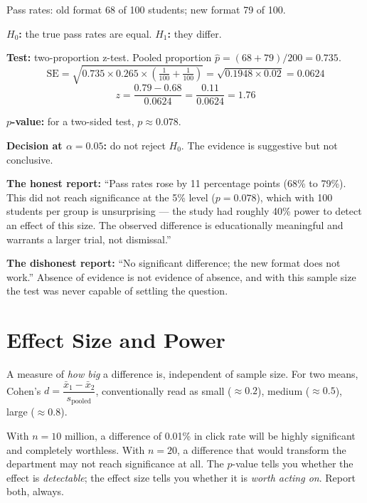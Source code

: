 \begin{worked}
Pass rates: old format 68 of 100 students; new format 79 of 100.

\smallskip
\textbf{$H_0$:} the true pass rates are equal. \quad \textbf{$H_1$:} they differ.

\textbf{Test:} two-proportion z-test.
Pooled proportion $\hat{p} = (68+79)/200 = 0.735$.
\[
\text{SE} = \sqrt{0.735 \times 0.265 \times \left(\tfrac{1}{100}+\tfrac{1}{100}\right)}
          = \sqrt{0.1948 \times 0.02} = 0.0624
\]
\[
z = \frac{0.79 - 0.68}{0.0624} = \frac{0.11}{0.0624} = 1.76
\]

\textbf{$p$-value:} for a two-sided test, $p \approx 0.078$.

\smallskip
\textbf{Decision at $\alpha = 0.05$:} do not reject $H_0$. The evidence is
suggestive but not conclusive.

\textbf{The honest report:} ``Pass rates rose by 11 percentage points
(68\% to 79\%). This did not reach significance at the 5\% level ($p = 0.078$),
which with 100 students per group is unsurprising --- the study had roughly 40\%
power to detect an effect of this size. The observed difference is educationally
meaningful and warrants a larger trial, not dismissal.''

\smallskip
\textbf{The dishonest report:} ``No significant difference; the new format does not
work.'' Absence of evidence is not evidence of absence, and with this sample size
the test was never capable of settling the question.
\end{worked}

\section{Effect Size and Power}

\begin{definitionbox}
A measure of \emph{how big} a difference is, independent of sample size. For two
means, Cohen's $d = \dfrac{\bar{x}_1 - \bar{x}_2}{s_{\text{pooled}}}$, conventionally
read as small ($\approx 0.2$), medium ($\approx 0.5$), large ($\approx 0.8$).
\end{definitionbox}

\begin{conceptbox}
With $n = 10$ million, a difference of 0.01\% in click rate will be highly
significant and completely worthless. With $n = 20$, a difference that would
transform the department may not reach significance at all. The $p$-value tells you
whether the effect is \emph{detectable}; the effect size tells you whether it is
\emph{worth acting on}. Report both, always.
\end{conceptbox}

